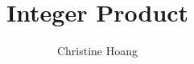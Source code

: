 \documentclass{article}
\title{Integer Product}
\author{Christine Hoang}
\begin{document}
\maketitle

\section{}
\end{document}
